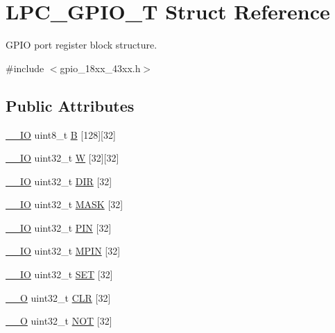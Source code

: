 \hypertarget{struct_l_p_c___g_p_i_o___t}{}\section{L\+P\+C\+\_\+\+G\+P\+I\+O\+\_\+T Struct Reference}
\label{struct_l_p_c___g_p_i_o___t}


G\+P\+IO port register block structure.  




{\ttfamily \#include $<$gpio\+\_\+18xx\+\_\+43xx.\+h$>$}

\subsection*{Public Attributes}
\begin{DoxyCompactItemize}
\item 
\hyperlink{core__sc300_8h_aec43007d9998a0a0e01faede4133d6be}{\+\_\+\+\_\+\+IO} uint8\+\_\+t \hyperlink{struct_l_p_c___g_p_i_o___t_afab9d12b9b8bf02d2c9cfa4893244c7f}{B} \mbox{[}128\mbox{]}\mbox{[}32\mbox{]}
\item 
\hyperlink{core__sc300_8h_aec43007d9998a0a0e01faede4133d6be}{\+\_\+\+\_\+\+IO} uint32\+\_\+t \hyperlink{struct_l_p_c___g_p_i_o___t_a66399e55373c51ac06bc5c6f896706b6}{W} \mbox{[}32\mbox{]}\mbox{[}32\mbox{]}
\item 
\hyperlink{core__sc300_8h_aec43007d9998a0a0e01faede4133d6be}{\+\_\+\+\_\+\+IO} uint32\+\_\+t \hyperlink{struct_l_p_c___g_p_i_o___t_a3e0f544e9066a86ac598a9d7afa3713b}{D\+IR} \mbox{[}32\mbox{]}
\item 
\hyperlink{core__sc300_8h_aec43007d9998a0a0e01faede4133d6be}{\+\_\+\+\_\+\+IO} uint32\+\_\+t \hyperlink{struct_l_p_c___g_p_i_o___t_ac3a6d577e23cd7061700b2555a84827c}{M\+A\+SK} \mbox{[}32\mbox{]}
\item 
\hyperlink{core__sc300_8h_aec43007d9998a0a0e01faede4133d6be}{\+\_\+\+\_\+\+IO} uint32\+\_\+t \hyperlink{struct_l_p_c___g_p_i_o___t_ae8c4c17105e4a8180f4c8456c2db2219}{P\+IN} \mbox{[}32\mbox{]}
\item 
\hyperlink{core__sc300_8h_aec43007d9998a0a0e01faede4133d6be}{\+\_\+\+\_\+\+IO} uint32\+\_\+t \hyperlink{struct_l_p_c___g_p_i_o___t_a76b2d3f4c151c8c89030dcd5e53ec1f8}{M\+P\+IN} \mbox{[}32\mbox{]}
\item 
\hyperlink{core__sc300_8h_aec43007d9998a0a0e01faede4133d6be}{\+\_\+\+\_\+\+IO} uint32\+\_\+t \hyperlink{struct_l_p_c___g_p_i_o___t_a6bc4f0b21dca8c53a121db33850bab29}{S\+ET} \mbox{[}32\mbox{]}
\item 
\hyperlink{core__sc300_8h_a7e25d9380f9ef903923964322e71f2f6}{\+\_\+\+\_\+O} uint32\+\_\+t \hyperlink{struct_l_p_c___g_p_i_o___t_a7f34f27b387316a478bac811800c07a2}{C\+LR} \mbox{[}32\mbox{]}
\item 
\hyperlink{core__sc300_8h_a7e25d9380f9ef903923964322e71f2f6}{\+\_\+\+\_\+O} uint32\+\_\+t \hyperlink{struct_l_p_c___g_p_i_o___t_aa795ddb42bf007fa85439fffc02536ac}{N\+OT} \mbox{[}32\mbox{]}
\end{DoxyCompactItemize}


